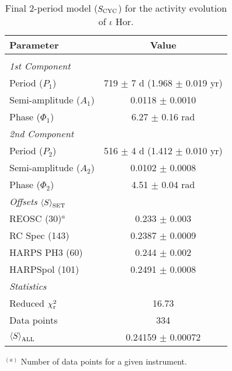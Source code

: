 \documentclass[a4paper,fleqn,usenatbib]{mnras}
\begin{document}
\begin{table}
\caption{Final 2-period model ($S_{\rm CYC}$) for the activity evolution of $\iota$ Hor.}
\label{tab_3}      %
\centering                          %
\begin{threeparttable}
\begin{tabular}{l c}        %
\hline\hline                 %
Parameter & Value \\
\hline
& \\[-8pt]
\textit{1st Component} & \\
Period ($P_1$) & 719 $\pm$ 7 d (1.968 $\pm$ 0.019 yr)\\ 
Semi-amplitude ($A_1$) & 0.0118 $\pm$ 0.0010 \\
Phase ($\Phi_1$) & 6.27 $\pm$ 0.16 rad \\[3pt]
\textit{2nd Component} & \\ 
Period ($P_2$) & 516 $\pm$ 4 d (1.412 $\pm$ 0.010 yr)\\ 
Semi-amplitude ($A_2$) & 0.0102 $\pm$ 0.0008 \\
Phase ($\Phi_2$) & 4.51 $\pm$ 0.04 rad \\[3pt]
\textit{Offsets} $\left<S\right>_{\rm SET}$ & \\ 
REOSC (30)$^{a}$ & 0.233 $\pm$ 0.003 \\ 
RC Spec (143) & 0.2387 $\pm$ 0.0009 \\
HARPS PH3 (60) & 0.244 $\pm$ 0.002 \\  
HARPSpol (101) & 0.2491 $\pm$ 0.0008 \\[3pt] 
\textit{Statistics} & \\ 
Reduced $\chi^2_{\rm r}$ & 16.73 \\ 
Data points  & 334 \\
$\left<S\right>_{\rm ALL}$ & 0.24159 $\pm$ 0.00072\\[1pt]
\hline
\end{tabular}
\begin{tablenotes}
{\small $^{(a)}$ Number of data points for a given instrument.}
\end{tablenotes}
\end{threeparttable}
\end{table}
\end{document}
